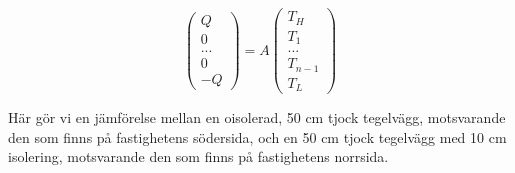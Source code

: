 \begin{equation}
\label{eq:staticwallmethod:full}
\begin{pmatrix}
Q\\0\\...\\0\\-Q
\end{pmatrix} = A
\begin{pmatrix}
T_H\\T_1\\...\\T_{n-1}\\T_L
\end{pmatrix}
\end{equation}

Här gör vi en jämförelse mellan en oisolerad, 50 cm tjock tegelvägg, motsvarande den som finns på fastighetens södersida, och en 50 cm tjock tegelvägg med 10 cm isolering, motsvarande den som finns på fastighetens norrsida.
